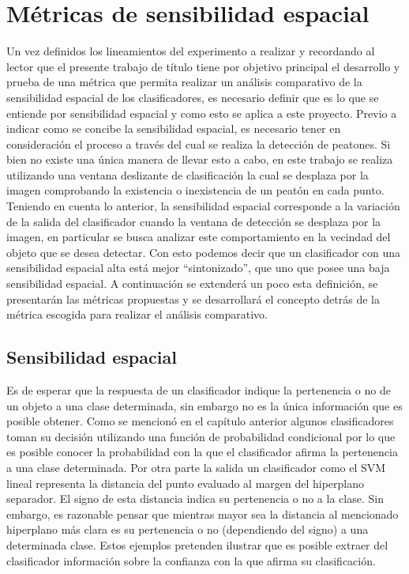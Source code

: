 
\chapter{M\'etricas de sensibilidad espacial}
\label{cap:metricas}

Un vez definidos los lineamientos del experimento a realizar y recordando al lector que el presente trabajo de título tiene por objetivo principal el desarrollo y prueba de una métrica que permita realizar un análisis comparativo de la sensibilidad espacial de los clasificadores, es necesario definir que es lo que se entiende por sensibilidad espacial y como esto se aplica a este proyecto. 
Previo a indicar como se concibe la sensibilidad espacial, es necesario tener en consideración el proceso a través del cual se realiza la detección de peatones. Si bien no existe una única manera de llevar esto a cabo, en este trabajo se realiza utilizando una ventana deslizante de clasificación la cual se desplaza por la imagen comprobando la existencia o inexistencia de un peatón en cada punto. 
Teniendo en cuenta lo anterior, la sensibilidad espacial corresponde a la variación de la salida del clasificador cuando la ventana de detección se desplaza por la imagen, en particular se busca analizar este comportamiento en la vecindad del objeto que se desea detectar. Con esto podemos decir que un clasificador con una sensibilidad espacial alta está mejor ``sintonizado'', que uno que posee una baja sensibilidad espacial. A continuación se extenderá un poco esta definición, se presentarán las métricas propuestas y se desarrollará el concepto detrás de la métrica escogida para realizar el análisis comparativo.

\section{Sensibilidad espacial}
\label{metricas:sensibilidad}

Es de esperar que la respuesta de un clasificador indique la pertenencia o no de un objeto a una clase determinada, sin embargo no es la única información que es posible obtener. Como se mencionó en el capítulo anterior algunos clasificadores toman su decisión utilizando una función de probabilidad condicional por lo que es posible conocer la probabilidad con la que el clasificador afirma la pertenencia a una clase determinada. Por otra parte la salida un clasificador como el SVM lineal representa la distancia del punto evaluado al margen del hiperplano separador. El signo de esta distancia indica su pertenencia o no a la clase. Sin embargo, es razonable pensar que mientras mayor sea la distancia al mencionado hiperplano más clara es su pertenencia o no (dependiendo del signo) a una determinada clase. Estos ejemplos pretenden ilustrar que es posible extraer del clasificador información sobre la confianza con la que afirma su clasificación. 

